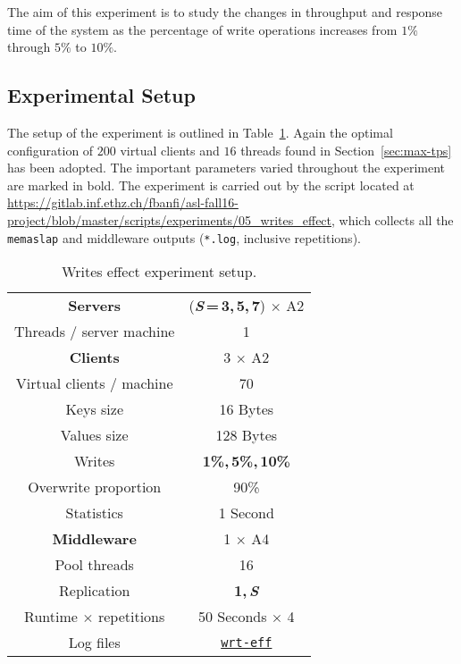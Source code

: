 \documentclass[11pt]{article}
\theoremstyle{definition}
\renewcommand\b[1]{{\bf{#1}}}
\renewcommand\t\texttt
\begin{document}
The aim of this experiment is to study the changes in throughput and response time of the system as the percentage of write operations increases from $1\%$ through $5\%$ to $10\%$.

\subsection{Experimental Setup}

The setup of the experiment is outlined in Table~\ref{tab:exp5}.
Again the optimal configuration of $200$ virtual clients and $16$ threads found in Section~\ref{sec:max-tps} has been adopted.
The important parameters varied throughout the experiment are marked in bold.
The experiment is carried out by the script located at  \url{https://gitlab.inf.ethz.ch/fbanfi/asl-fall16-project/blob/master/scripts/experiments/05_writes_effect}, which collects all the \t{memaslap} and middleware outputs (\t{*.log}, inclusive repetitions).

\begin{table}[!h]
    \centering
    \small
    {
        \smallskip
        \begin{tabular}{|c|c|}
            \hline \b{Servers} & (\b{\textit S\,=\,3,\,5,\,7}) $\times$ A2 \\ 
            {Threads / server machine} & 1 \\ 
            \hline\hline \b{Clients} & 3 $\times$ A2 \\ 
            {Virtual clients / machine} &  70 \\ 
            {Keys size} & 16 Bytes \\
            {Values size} & 128 Bytes \\
            {Writes} & \b{1\%,\,5\%,\,10\%} \\
            {Overwrite proportion} & 90\% \\
            {Statistics} & 1 Second \\
            \hline\hline \b{Middleware} & 1 $\times$ A4 \\ 
            {Pool threads} & 16 \\ 
            {Replication} & \b{1,\,\textit S} \\ 
            \hline\hline {Runtime $\times$ repetitions} & 50 Seconds $\times$ 4 \\ 
            {Log files} & \hyperref[f:wrt]{\t{wrt-eff}} \\
            \hline 
        \end{tabular}
    }
    \caption{Writes effect experiment setup.}
    \label{tab:exp5}
\end{table}
\end{document}
